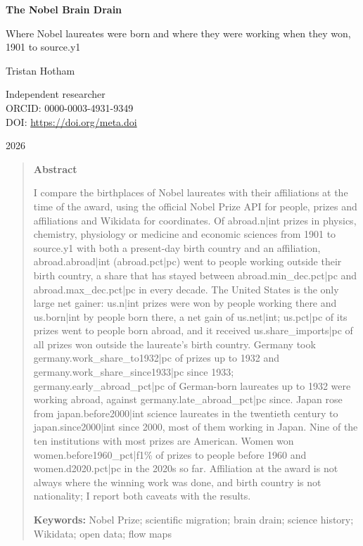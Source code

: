 \documentclass[11pt,a4paper]{article}
\begin{document}
\begin{center}
{\Large\bfseries The Nobel Brain Drain\par}
\vspace{0.4em}
{\large Where Nobel laureates were born and where they were working when they won,\\1901 to {{source.y1}}\par}
\vspace{1.2em}
{\large Tristan Hotham\par}
\vspace{0.3em}
{\small Independent researcher\\
ORCID: 0000-0003-4931-9349\\
DOI: \href{https://doi.org/{{meta.doi}}}{https://doi.org/{{meta.doi}}}\par}
\vspace{0.8em}
2026
\end{center}

\begin{quote}
\small
\begin{center}\textbf{Abstract}\end{center}
I compare the birthplaces of Nobel laureates with their affiliations at the time of the award, using the official Nobel Prize API for people, prizes and affiliations and Wikidata for coordinates. Of {{abroad.n|int}} prizes in physics, chemistry, physiology or medicine and economic sciences from 1901 to {{source.y1}} with both a present-day birth country and an affiliation, {{abroad.abroad|int}} ({{abroad.pct|pc}}) went to people working outside their birth country, a share that has stayed between {{abroad.min_dec.pct|pc}} and {{abroad.max_dec.pct|pc}} in every decade. The United States is the only large net gainer: {{us.n|int}} prizes were won by people working there and {{us.born|int}} by people born there, a net gain of {{us.net|int}}; {{us.pct|pc}} of its prizes went to people born abroad, and it received {{us.share_imports|pc}} of all prizes won outside the laureate's birth country. Germany took {{germany.work_share_to1932|pc}} of prizes up to 1932 and {{germany.work_share_since1933|pc}} since 1933; {{germany.early_abroad_pct|pc}} of German-born laureates up to 1932 were working abroad, against {{germany.late_abroad_pct|pc}} since. Japan rose from {{japan.before2000|int}} science laureates in the twentieth century to {{japan.since2000|int}} since 2000, most of them working in Japan. Nine of the ten institutions with most prizes are American. Women won {{women.before1960_pct|f1}}\% of prizes to people before 1960 and {{women.d2020.pct|pc}} in the 2020s so far. Affiliation at the award is not always where the winning work was done, and birth country is not nationality; I report both caveats with the results.

\textbf{Keywords:} Nobel Prize; scientific migration; brain drain; science history; Wikidata; open data; flow maps
\end{quote}
\end{document}
